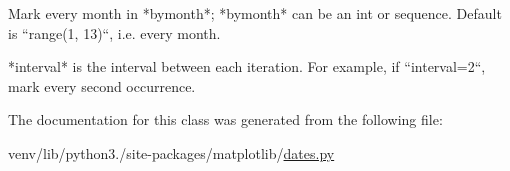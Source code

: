 \begin{DoxyVerb}Mark every month in *bymonth*; *bymonth* can be an int or
sequence.  Default is ``range(1, 13)``, i.e. every month.

*interval* is the interval between each iteration.  For
example, if ``interval=2``, mark every second occurrence.
\end{DoxyVerb}
 

The documentation for this class was generated from the following file\+:\begin{DoxyCompactItemize}
\item 
venv/lib/python3./site-\/packages/matplotlib/\hyperlink{dates_8py}{dates.\+py}\end{DoxyCompactItemize}
